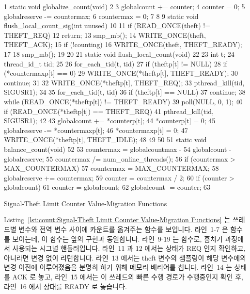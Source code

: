 \begin{listing}[tbp]
{ \scriptsize
\begin{verbbox}
  1 static void globalize_count(void)
  2 {
  3   globalcount += counter;
  4   counter = 0;
  5   globalreserve -= countermax;
  6   countermax = 0;
  7 }
  8 
  9 static void flush_local_count_sig(int unused)
 10 {
 11   if (READ_ONCE(theft) != THEFT_REQ)
 12     return;
 13   smp_mb();
 14   WRITE_ONCE(theft, THEFT_ACK);
 15   if (!counting) {
 16     WRITE_ONCE(theft, THEFT_READY);
 17   }
 18   smp_mb();
 19 }
 20 
 21 static void flush_local_count(void)
 22 {
 23   int t;
 24   thread_id_t tid;
 25 
 26   for_each_tid(t, tid)
 27     if (theftp[t] != NULL) {
 28       if (*countermaxp[t] == 0) {
 29         WRITE_ONCE(*theftp[t], THEFT_READY);
 30         continue;
 31       }
 32       WRITE_ONCE(*theftp[t], THEFT_REQ);
 33       pthread_kill(tid, SIGUSR1);
 34     }
 35   for_each_tid(t, tid) {
 36     if (theftp[t] == NULL)
 37       continue;
 38     while (READ_ONCE(*theftp[t]) != THEFT_READY) {
 39       poll(NULL, 0, 1);
 40       if (READ_ONCE(*theftp[t]) == THEFT_REQ)
 41         pthread_kill(tid, SIGUSR1);
 42     }
 43     globalcount += *counterp[t];
 44     *counterp[t] = 0;
 45     globalreserve -= *countermaxp[t];
 46     *countermaxp[t] = 0;
 47     WRITE_ONCE(*theftp[t], THEFT_IDLE);
 48   }
 49 }
 50 
 51 static void balance_count(void)
 52 {
 53   countermax = globalcountmax -
 54     globalcount - globalreserve;
 55   countermax /= num_online_threads();
 56   if (countermax > MAX_COUNTERMAX)
 57     countermax = MAX_COUNTERMAX;
 58   globalreserve += countermax;
 59   counter = countermax / 2;
 60   if (counter > globalcount)
 61     counter = globalcount;
 62   globalcount -= counter;
 63 }
\end{verbbox}
}
\centering
\theverbbox
\caption{Signal-Theft Limit Counter Value-Migration Functions}
\label{lst:count:Signal-Theft Limit Counter Value-Migration Functions}
\end{listing}

Listing~\ref{lst:count:Signal-Theft Limit Counter Value-Migration Functions}
는 쓰레드별 변수와 전역 변수 사이에 카운트를 옮겨주는 함수를 보입니다.
라인~1-7 은  함수를 보이는데, 이 함수는 앞의 구현과
동일합니다.
라인~9-19 는  함수로, 훔치기 과정에서 사용되는
시그널 핸들러입니다.
라인~11 과 12 에서는  상태가 REQ 인지 확인하고, 아니라면 변경 없이
리턴합니다.
라인~13 에서는 theft 변수의 샘플링이 해당 변수에의 변경 이전에 이루어졌음을
분명히 하기 위해 메모리 배리어를 칩니다.
라인~14 는  상태를 ACK 로 놓고, 라인~15 에서는 이 쓰레드의 빠른 수행
경로가 수행중인지 확인 후, 라인~16 에서  상태를 READY 로 놓습니다.
\iffalse

